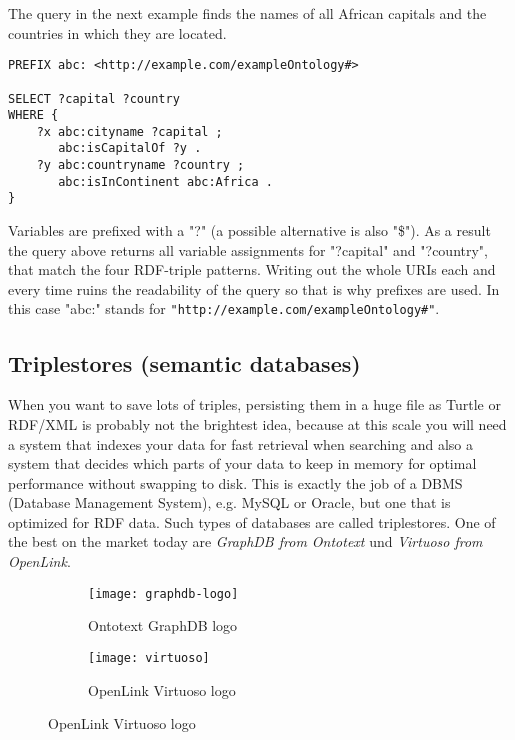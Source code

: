 The query in the next example finds the names of all African capitals and the countries in which they are located.

\begin{verbatim}
PREFIX abc: <http://example.com/exampleOntology#>

SELECT ?capital ?country
WHERE {
    ?x abc:cityname ?capital ;
       abc:isCapitalOf ?y .
    ?y abc:countryname ?country ;
       abc:isInContinent abc:Africa .
}
\end{verbatim}

Variables are prefixed with a "?" (a possible alternative is also "\$"). As a result the query above returns all variable assignments for "?capital" and "?country", that match the four RDF-triple patterns. Writing out the whole URIs each and every time ruins the readability of the query so that is why prefixes are used. In this case "abc:" stands for \texttt{"http://example.com/exampleOntology#"}.

\subsection{Triplestores (semantic databases)}
When you want to save lots of triples, persisting them in a huge file as Turtle or RDF/XML is probably not the brightest idea, because at this scale you will need a system that indexes your data for fast retrieval when searching and also a system that decides which parts of your data to keep in memory for optimal performance without swapping to disk.
This is exactly the job of a DBMS (Database Management System), e.g. MySQL or Oracle, but one that is optimized for RDF data. Such types of databases are called triplestores. One of the best on the market today are \textit{GraphDB from Ontotext} und \textit{Virtuoso from OpenLink}.

\begin{figure}[h!]
    \caption{Famous triplestore logos}
    \begin{subfigure}[b]{0.5\textwidth}
        \centering
        \texttt{[image: graphdb-logo]}
        \caption{Ontotext GraphDB logo}
        \label{fig:view}
    \end{subfigure}
    \begin{subfigure}[b]{0.5\textwidth}
        \centering
        \texttt{[image: virtuoso]}
        \caption{OpenLink Virtuoso logo}
    \label{fig:view}
    \end{subfigure}
\end{figure}

